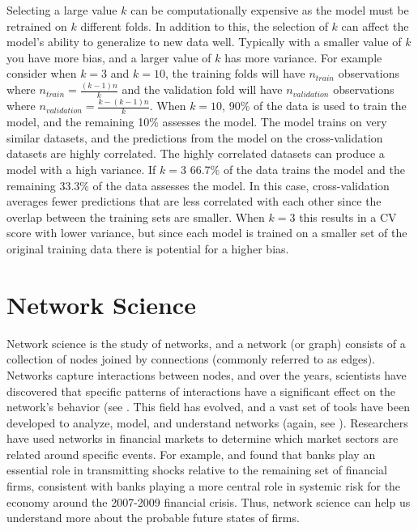 Selecting a large value \(k\) can be computationally expensive as the model must be retrained on \(k\) different folds. In addition to this, the selection of \(k\) can affect the model's ability to generalize to new data well. Typically with a smaller value of \(k\) you have more bias, and a larger value of \(k\) has more variance. For example consider when \(k=3\) and \(k=10\), the training folds will have \(n_{train}\) observations where  \( n_{train}= \frac{(k-1)n}{k}\) and the validation fold will have \(n_{validation}\) observations where \( n_{validation}= \frac{k-(k-1)n}{k}\). When \(k=10\), 90\% of the data is used to train the model, and the remaining 10\% assesses the model. The model trains on very similar datasets, and the predictions from the model on the cross-validation datasets are highly correlated. The highly correlated datasets can produce a model with a high variance. If \(k=3\) 66.7\% of the data trains the model and the remaining 33.3\% of the data assesses the model. In this case, cross-validation averages fewer predictions that are less correlated with each other since the overlap between the training sets are smaller. When \(k=3\) this results in a CV score with lower variance, but since each model is trained on a smaller set of the original training data there is potential for a higher bias. 


\section{Network Science} \label{sec:NetworkScience}


Network science is the study of networks, and a network (or graph) consists of a collection of nodes joined by connections (commonly referred to as edges).  Networks capture interactions between nodes, and over the years, scientists have discovered that specific patterns of interactions have a significant effect on the network's behavior (see \cite{Networks}.  This field has evolved, and a vast set of tools have been developed to analyze,  model,  and understand networks (again, see \cite{Networks}).  Researchers have used networks in financial markets to determine which market sectors are related around specific events.  For example,   \cite{Billio2012} and \cite{DieboldYilmaz2014}  found that banks play an essential role in transmitting shocks relative to the remaining set of financial firms,  consistent with banks playing a more central role in systemic risk for the economy around the 2007-2009 financial crisis.  Thus, network science can help us  understand more about the probable future states of firms.


